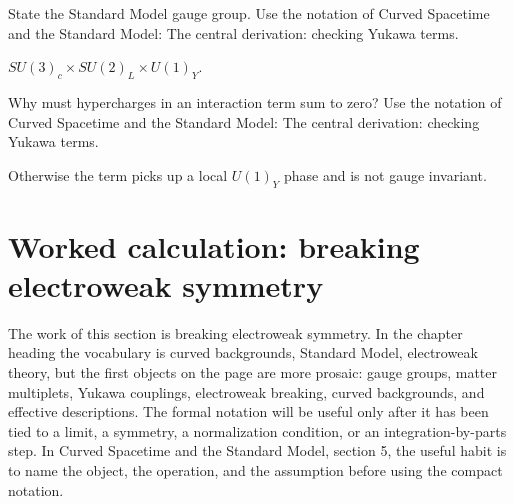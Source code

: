 \begin{exercise}
State the Standard Model gauge group.  Use the notation of Curved Spacetime and the Standard Model: The central derivation: checking Yukawa terms.
\begin{answer}
\(SU(3)_c\times SU(2)_L\times U(1)_Y\).
\end{answer}
\end{exercise}

\begin{exercise}
Why must hypercharges in an interaction term sum to zero?  Use the notation of Curved Spacetime and the Standard Model: The central derivation: checking Yukawa terms.
\begin{answer}
Otherwise the term picks up a local \(U(1)_Y\) phase and is not gauge invariant.
\end{answer}
\end{exercise}



\section{Worked calculation: breaking electroweak symmetry}













The work of this section is breaking electroweak symmetry.  In the chapter heading the vocabulary is curved backgrounds, Standard Model, electroweak theory, but the first objects on the page are more prosaic: gauge groups, matter multiplets, Yukawa couplings, electroweak breaking, curved backgrounds, and effective descriptions.  The formal notation will be useful only after it has been tied to a limit, a symmetry, a normalization condition, or an integration-by-parts step.  In Curved Spacetime and the Standard Model, section 5, the useful habit is to name the object, the operation, and the assumption before using the compact notation.


